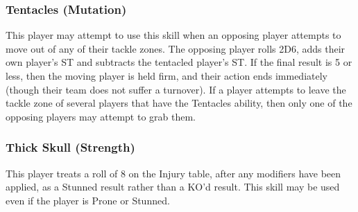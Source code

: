\documentclass{article}
\begin{document}
\begin{multicols}{3}
\subsubsection{Tentacles (Mutation)}
\par This player may attempt to use this skill when an opposing player attempts to move out of any of their tackle zones. The opposing player rolls 2D6, adds their own player's ST and subtracts the tentacled player's ST. If the final result is 5 or less, then the moving player is held firm, and their action ends immediately (though their team does not suffer a turnover). If a player attempts to leave the tackle zone of several players that have the Tentacles ability, then only one of the opposing players may attempt to grab them.

\subsubsection{Thick Skull (Strength)}
\par This player treats a roll of 8 on the Injury table, after any modifiers have been applied, as a Stunned result rather than a KO'd result. This skill may be used even if the player is Prone or Stunned.


\end{multicols}
\end{document}
